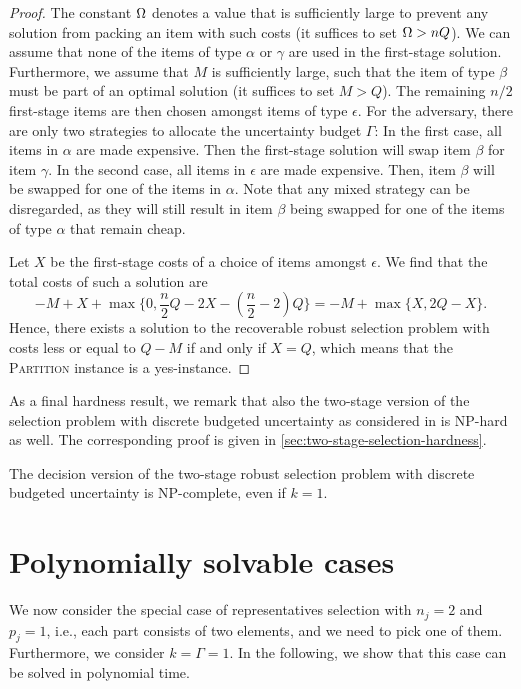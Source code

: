 \begin{proof}
The constant $\Omega$ denotes a value that is sufficiently large to prevent any solution from packing an item with such costs (it suffices to set $\Omega > nQ$).
We can assume that none of the items of type $\alpha$ or $\gamma$ are used in the first-stage solution. Furthermore, we assume that $M$ is sufficiently large, such that the item of type $\beta$ must be part of an optimal solution (it suffices to set $M > Q$). The remaining $n/2$ first-stage items are then chosen amongst items of type $\epsilon$. For the adversary, there are only two strategies to allocate the uncertainty budget $\Gamma$: In the first case, all items in $\alpha$ are made expensive. Then the first-stage solution will swap item $\beta$ for item $\gamma$. In the second case, all items in $\epsilon$ are made expensive. Then, item $\beta$ will be swapped for one of the items in $\alpha$. Note that any mixed strategy can be disregarded, as they will still result in item $\beta$ being swapped for one of the items of type $\alpha$ that remain cheap.

Let $X$ be the first-stage costs of a choice of items amongst $\epsilon$. We find that the total costs of such a solution are
\[ -M + X + \max\{ 0, \frac{n}{2}Q-2X-(\frac{n}{2}-2)Q\} = -M + \max\{ X, 2Q-X\}. \]
Hence, there exists a solution to the recoverable robust selection problem with costs less or equal to $Q-M$ if and only if $X=Q$, which means that the \textsc{Partition} instance is a yes-instance.

\end{proof}

As a final hardness result, we remark that also the two-stage version of the selection problem with discrete budgeted uncertainty as considered in \cite{chassein2018recoverable} is NP-hard as well. The corresponding proof is given in \cref{sec:two-stage-selection-hardness}.

\begin{theorem}\label{th:hardness3}
The decision version of the two-stage robust selection problem with discrete budgeted uncertainty is NP-complete, even if $k=1$.
\end{theorem}


\section{Polynomially solvable cases}

\label{sec:special}

We now consider the special case of representatives selection with $n_j=2$ and $p_j=1$, i.e., each part consists of two elements, and we need to pick one of them. Furthermore, we consider $k=\Gamma=1$. In the following, we show that this case can be solved in polynomial time. 

